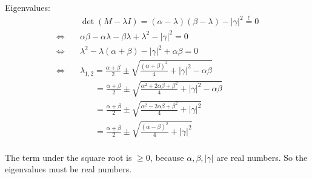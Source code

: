 \documentclass[a4paper,german,12pt,smallheadings]{scrartcl}
\begin{document}
\begin{enumerate}[a)]
    Eigenvalues:
    \begin{align*}
      &\det(M-\lambda I) = (\alpha - \lambda)(\beta - \lambda) - |\gamma|^2 \overset{!}{=} 0 \\
      \Leftrightarrow\quad& \alpha\beta - \alpha\lambda - \beta\lambda + \lambda^2 - |\gamma|^2 = 0 \\
      \Leftrightarrow\quad& \lambda^2 - \lambda(\alpha + \beta) - |\gamma|^2 + \alpha\beta = 0 \\
      \Leftrightarrow\quad& \lambda_{1,2} = \frac{\alpha+\beta}{2} \pm \sqrt{\frac{(\alpha + \beta)^2}{4} + |\gamma|^2 - \alpha\beta} \\
      & \quad\;\;\, = \frac{\alpha+\beta}{2} \pm \sqrt{\frac{\alpha^2 + 2\alpha\beta + \beta^2}{4} + |\gamma|^2 - \alpha\beta} \\
      & \quad\;\;\, = \frac{\alpha+\beta}{2} \pm \sqrt{\frac{\alpha^2 - 2\alpha\beta + \beta^2}{4} + |\gamma|^2} \\
      & \quad\;\;\,= \frac{\alpha+\beta}{2} \pm \sqrt{\frac{(\alpha - \beta)^2}{4} + |\gamma|^2} \\
    \end{align*}

    The term under the square root is $\ge 0$, because $\alpha, \beta,
    |\gamma|$ are real numbers. So the eigenvalues must be real numbers.
\end{enumerate}
\end{document}
